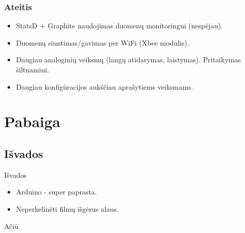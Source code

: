 \documentclass[12pt,a4paper]{beamer}
\begin{document}
\begin{frame}
    \frametitle{Ateitis}

    \begin{itemize}
        \item StatsD + Graphite naudojimas duomenų monitoringui (nespėjau).
        \item Duomenų siuntimas/gavimas per WiFi (Xbee modulis).
        \item Daugiau analoginių veiksmų (langų atidarymas, laistymas). Pritaikymas šiltnamiui.
        \item Daugiau konfigūracijos aukščiau aprašytiems veiksmams.
    \end{itemize}
    
\end{frame}

\section{Pabaiga}

\subsection{Išvados}
\begin{frame}{Išvados}
    \begin{itemize}
        \item Arduino - super paprasta.
        \item Neperkelinėti filmų išgėrus alaus.
    \end{itemize}
\end{frame}

\begin{frame}
	\begin{center}
        {\Huge Ačiū}
	\end{center}
\end{frame}
\end{document}

